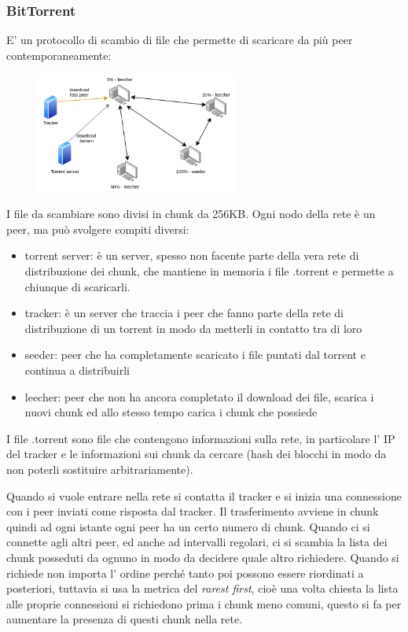 \subsubsection{BitTorrent}
E' un protocollo di scambio di file che permette di scaricare da più peer contemporaneamente:
\begin{figure}[H]
    \centering
    \includegraphics[width=250px]{images/2_Applicazioni_di_rete/bittorrent.png}
\end{figure}
I file da scambiare sono divisi in chunk da 256KB.
Ogni nodo della rete è un peer, ma può svolgere compiti diversi:
\begin{itemize}
    \item torrent server: è un server, spesso non facente parte della vera rete di distribuzione dei chunk, che mantiene in memoria i file .torrent e permette a chiunque di scaricarli.

    \item tracker: è un server che traccia i peer che fanno parte della rete di distribuzione di un torrent in modo da metterli in contatto tra di loro
    
    \item seeder: peer che ha completamente scaricato i file puntati dal torrent e continua a distribuirli
    
    \item leecher: peer che non ha ancora completato il download dei file, scarica i nuovi chunk ed allo stesso tempo carica i chunk che possiede
\end{itemize}

I file .torrent sono file che contengono informazioni sulla rete, in particolare l' IP del tracker e le informazioni sui chunk da cercare (hash dei blocchi in modo da non poterli sostituire arbitrariamente).

Quando si vuole entrare nella rete si contatta il tracker e si inizia una connessione con i peer inviati come risposta dal tracker.
Il trasferimento avviene in chunk quindi ad ogni istante ogni peer ha un certo numero di chunk.
Quando ci si connette agli altri peer, ed anche ad intervalli regolari, ci si scambia la lista dei chunk posseduti da ognuno in modo da decidere quale altro richiedere.
Quando si richiede non importa l' ordine perché tanto poi possono essere riordinati a posteriori, tuttavia si usa la metrica del \emph{rarest first}, cioè una volta chiesta la lista alle proprie connessioni si richiedono prima i chunk meno comuni, questo si fa per aumentare la presenza di questi chunk nella rete.

